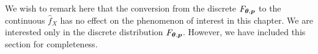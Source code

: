 
	We wish to remark here that the conversion from the discrete $F_{{\bm{{\theta}}}, {\bm{{p}}}}$ to the continuous $\hat{f}_X$ has no effect on the phenomenon of interest in this chapter. We are interested only in the discrete distribution $F_{{\bm{{\theta}}}, {\bm{{p}}}}$. However, we have included this section for completeness.






